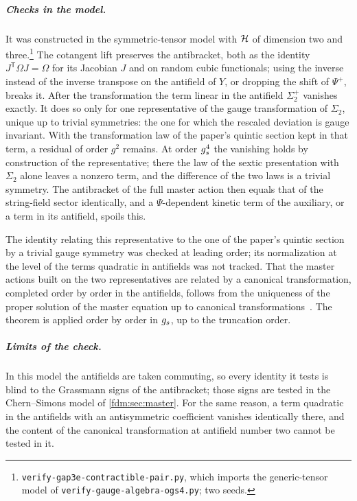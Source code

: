 \subparagraph{Checks in the model.}
It was constructed in the symmetric-tensor model with $\mathcal{H}$ of dimension two and three.\footnote{\texttt{verify-gap3e-contractible-pair.py}, which imports the generic-tensor model of \texttt{verify-gauge-algebra-ogs4.py}; two seeds.}
The cotangent lift preserves the antibracket, both as the identity $J^{\mathsf T} \Omega J = \Omega$ for its Jacobian $J$ and on random cubic functionals; using the inverse instead of the inverse transpose on the antifield of $Y$, or dropping the shift of $\Psi^+$, breaks it.
After the transformation the term linear in the antifield $\Sigma_2^+$ vanishes exactly.
It does so only for one representative of the gauge transformation of $\Sigma_2$, unique up to trivial symmetries: the one for which the rescaled deviation is gauge invariant.
With the transformation law of the paper's quintic section kept in that term, a residual of order $g^2$ remains.
At order $g_s^4$ the vanishing holds by construction of the representative; there the law of the sextic presentation with $\Sigma_2$ alone leaves a nonzero term, and the difference of the two laws is a trivial symmetry.
The antibracket of the full master action then equals that of the string-field sector identically, and a $\Psi$-dependent kinetic term of the auxiliary, or a term in its antifield, spoils this.

The identity relating this representative to the one of the paper's quintic section by a trivial gauge symmetry was checked at leading order; its normalization at the level of the terms quadratic in antifields was not tracked.
That the master actions built on the two representatives are related by a canonical transformation, completed order by order in the antifields, follows from the uniqueness of the proper solution of the master equation up to canonical transformations~\cites[sec.~17.3.4]{Henneaux:1994:QuantizationGaugeSystems-kn}{Fisch:1990:HomologicalPerturbationTheory}{Gomis:1995:AntibracketAntifieldsGaugeTheory}.
The theorem is applied order by order in $g_s$, up to the truncation order.

\subparagraph{Limits of the check.}
In this model the antifields are taken commuting, so every identity it tests is blind to the Grassmann signs of the antibracket; those signs are tested in the Chern--Simons model of \cref{fdm:sec:master}.
For the same reason, a term quadratic in the antifields with an antisymmetric coefficient vanishes identically there, and the content of the canonical transformation at antifield number two cannot be tested in it.

